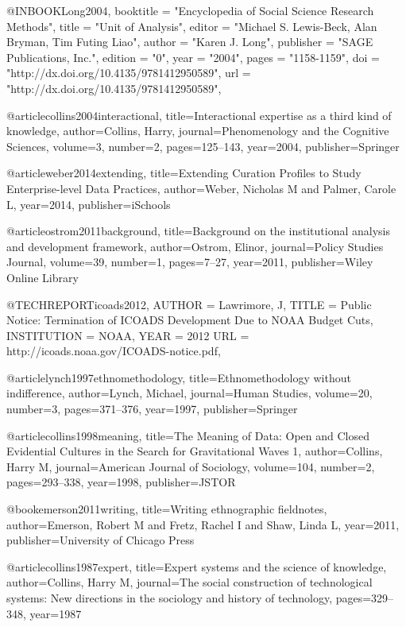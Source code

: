 @INBOOK{Long2004,
	booktitle = "Encyclopedia of Social Science Research Methods",
	title = "Unit of Analysis",
	editor = "Michael S. Lewis-Beck, Alan Bryman, Tim Futing Liao",
	author = "Karen J. Long",
	publisher = "SAGE Publications, Inc.",
	edition = "0",
	year = "2004",
	pages = "1158-1159",
	doi = "http://dx.doi.org/10.4135/9781412950589",
	url = "http://dx.doi.org/10.4135/9781412950589",
}

@article{collins2004interactional,
  title={Interactional expertise as a third kind of knowledge},
  author={Collins, Harry},
  journal={Phenomenology and the Cognitive Sciences},
  volume={3},
  number={2},
  pages={125--143},
  year={2004},
  publisher={Springer}
}

@article{weber2014extending,
  title={Extending Curation Profiles to Study Enterprise-level Data Practices},
  author={Weber, Nicholas M and Palmer, Carole L},
  year={2014},
  publisher={iSchools}
}

@article{ostrom2011background,
  title={Background on the institutional analysis and development framework},
  author={Ostrom, Elinor},
  journal={Policy Studies Journal},
  volume={39},
  number={1},
  pages={7--27},
  year={2011},
  publisher={Wiley Online Library}
}


@TECHREPORT{icoads2012,
  AUTHOR =        {Lawrimore, J},
  TITLE =         {Public Notice: Termination of ICOADS Development Due to NOAA Budget Cuts},
  INSTITUTION =   {NOAA},
  YEAR = {2012}
  URL   =         {http://icoads.noaa.gov/ICOADS-notice.pdf},
}

@article{lynch1997ethnomethodology,
  title={Ethnomethodology without indifference},
  author={Lynch, Michael},
  journal={Human Studies},
  volume={20},
  number={3},
  pages={371--376},
  year={1997},
  publisher={Springer}
}

@article{collins1998meaning,
  title={The Meaning of Data: Open and Closed Evidential Cultures in the Search for Gravitational Waves 1},
  author={Collins, Harry M},
  journal={American Journal of Sociology},
  volume={104},
  number={2},
  pages={293--338},
  year={1998},
  publisher={JSTOR}
}

@book{emerson2011writing,
  title={Writing ethnographic fieldnotes},
  author={Emerson, Robert M and Fretz, Rachel I and Shaw, Linda L},
  year={2011},
  publisher={University of Chicago Press}
}



@article{collins1987expert,
  title={Expert systems and the science of knowledge},
  author={Collins, Harry M},
  journal={The social construction of technological systems: New directions in the sociology and history of technology},
  pages={329--348},
  year={1987}
}

